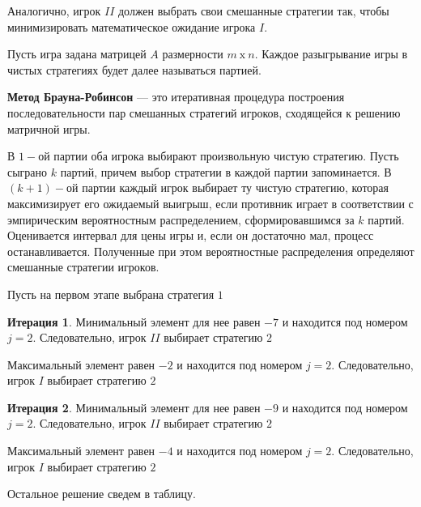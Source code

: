 \documentclass[11pt]{article}
\begin{document}
Аналогично, игрок $II$ должен выбрать свои смешанные стратегии так, чтобы минимизировать математическое ожидание игрока $I$.

Пусть игра задана матрицей $A$ размерности $m \ \text{x} \ n$. Каждое разыгрывание игры в чистых стратегиях будет далее называться партией. 

\textbf{Метод Брауна-Робинсон} — это итеративная процедура построения последовательности пар смешанных стратегий игроков, сходящейся к решению матричной игры.

В $1-$ой партии оба игрока выбирают произвольную чистую стратегию. Пусть сыграно $k$ партий, причем выбор стратегии в каждой партии запоминается. В $(k + 1)-$ой партии каждый игрок выбирает ту чистую стратегию, которая максимизирует его ожидаемый выигрыш, если противник играет в соответствии с эмпирическим вероятностным распределением, сформировавшимся за $k$ партий.
Оценивается интервал для цены игры и, если он достаточно мал, процесс останавливается. Полученные при этом вероятностные распределения определяют смешанные стратегии игроков.

Пусть на первом этапе выбрана стратегия $1$

\textbf{Итерация 1}. Минимальный элемент для нее равен $-7$ и находится под номером $j=2$. Следовательно, игрок $II$ выбирает стратегию $2$

Максимальный элемент равен $-2$ и находится под номером $j=2$. Следовательно, игрок $I$ выбирает стратегию $2$

\textbf{Итерация 2}. Минимальный элемент для нее равен $-9$ и находится под номером $j=2$. Следовательно, игрок $II$ выбирает стратегию $2$

Максимальный элемент равен $-4$ и находится под номером $j=2$. Следовательно, игрок $I$ выбирает стратегию $2$

Остальное решение сведем в таблицу.
\newpage
\end{document}
